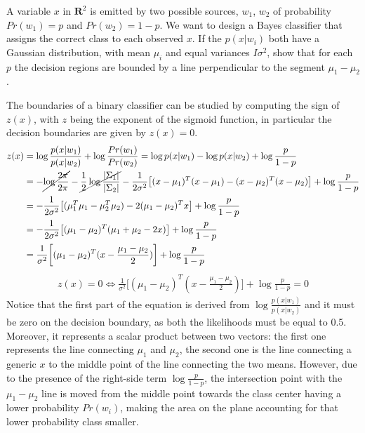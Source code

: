 \Exercise[number={5}]
A variable \(x\) in \(\mathbf{R}^2\) is emitted by two possible sources,
\(w_1\), \(w_2\) of probability \(Pr(w_1)=p\) and \(Pr(w_2)=1-p\). 
We want to design a Bayes classifier that assigns the correct class to each
observed \(x\). If the \(p(x|w_i)\) both have a Gaussian distribution, with
mean \(\mu_i\) and equal variances \(I\sigma^2\), show that for each \(p\)
the decision regions are bounded by a line perpendicular to the segment
\(\mu_1-\mu_2\).

\Answer[number={5}]
The boundaries of a binary classifier can be studied by computing the
sign of \(z(x)\), with \(z\) being the exponent of the sigmoid function, in
particular the decision boundaries are given by \(z(x)=0\).
\begin{align*}
    z(x)
    &=\log{\frac{p(x|w_1)}{p(x|w_2)}} + \log{\frac{Pr(w_1)}{Pr(w_2)}}
    =\log{p(x|w_1)}-\log{p(x|w_2)}+\log{\frac{p}{1-p}}\\
    &=-\cancel{\log{\frac{2\pi}{2\pi}}}-\cancel{\frac{1}{2}\log{\frac{|\Sigma_1|}{|\Sigma_2|}}}-\frac{1}{2\sigma^2}\bigl[(x-\mu_1)^T(x-\mu_1)-(x-\mu_2)^T(x-\mu_2)\bigr]+\log{\frac{p}{1-p}}\\
    &=-\frac{1}{2\sigma^2}\bigl[(\mu_1^T\mu_1-\mu_2^T\mu_2)-2(\mu_1-\mu_2)^Tx\bigr]+\log{\frac{p}{1-p}}\\
    &=-\frac{1}{2\sigma^2}\bigl[(\mu_1-\mu_2)^T(\mu_1+\mu_2-2x)\bigr]+\log{\frac{p}{1-p}}\\
    &=\frac{1}{\sigma^2}\biggl[(\mu_1-\mu_2)^T(x-\frac{\mu_1-\mu_2}{2})\biggr]+\log{\frac{p}{1-p}}
\end{align*}
\begin{align*}
    z(x)=0 \Longleftrightarrow \frac{1}{\sigma^2}\biggl[(\mu_1-\mu_2)^T(x-\frac{\mu_1-\mu_2}{2})\biggr]+\log{\frac{p}{1-p}}=0
\end{align*}
Notice that the first part of the equation is derived from
\(\log{\frac{p(x|w_1)}{p(x|w_2)}}\) and it must be zero on the decision
boundary, as both the likelihoods must be equal to 0.5. Moreover, it represents
a scalar product between two vectors: the first one represents the line
connecting \(\mu_1\) and \(\mu_2\), the second one is the line connecting
a generic \(x\) to the middle point of the line connecting the two means.
However, due to the presence of the right-side term \(\log{\frac{p}{1-p}}\),
the intersection point with the \(\mu_1-\mu_2\) line is moved from
the middle point towards the class center having a lower probability \(Pr(w_i)\),
making the area on the plane accounting for that lower probability class smaller.
